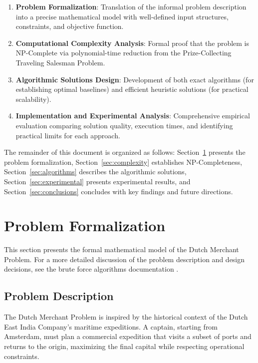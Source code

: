 \documentclass[12pt]{article}
\begin{document}
\begin{enumerate}
    \item \textbf{Problem Formalization}: Translation of the informal problem description into a precise mathematical model with well-defined input structures, constraints, and objective function.
    \item \textbf{Computational Complexity Analysis}: Formal proof that the problem is NP-Complete via polynomial-time reduction from the Prize-Collecting Traveling Salesman Problem.
    \item \textbf{Algorithmic Solutions Design}: Development of both exact algorithms (for establishing optimal baselines) and efficient heuristic solutions (for practical scalability).
    \item \textbf{Implementation and Experimental Analysis}: Comprehensive empirical evaluation comparing solution quality, execution times, and identifying practical limits for each approach.
\end{enumerate}

The remainder of this document is organized as follows: Section~\ref{sec:formalization} presents the problem formalization, Section~\ref{sec:complexity} establishes NP-Completeness, Section~\ref{sec:algorithms} describes the algorithmic solutions, Section~\ref{sec:experimental} presents experimental results, and Section~\ref{sec:conclusions} concludes with key findings and future directions.

\section{Problem Formalization}
\label{sec:formalization}

This section presents the formal mathematical model of the Dutch Merchant Problem. For a more detailed discussion of the problem description and design decisions, see the brute force algorithms documentation \cite{brute_force_doc}.

\subsection{Problem Description}

The Dutch Merchant Problem is inspired by the historical context of the Dutch East India Company's maritime expeditions. A captain, starting from Amsterdam, must plan a commercial expedition that visits a subset of ports and returns to the origin, maximizing the final capital while respecting operational constraints.
\end{document}
